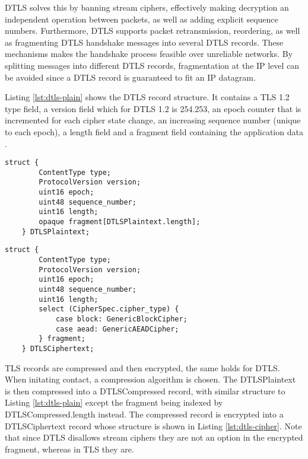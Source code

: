 \documentclass[0-thesis.tex]{subfiles}
\begin{document}
DTLS solves this by banning stream ciphers, effectively making decryption an independent
operation between packets, as well as adding explicit sequence numbers. Furthermore, DTLS
supports packet retransmission, reordering, as well as fragmenting DTLS handshake messages
into several DTLS records. These mechanisms makes the handshake process feasible over
unreliable networks. By splitting messages into different DTLS records, fragmentation at
the IP level can be avoided since a DTLS record is guaranteed to fit an IP datagram.

Listing \ref{lst:dtls-plain} shows the DTLS record structure. It contains a TLS 1.2 type
field, a version field which for DTLS 1.2 is 254.253, an epoch counter that is incremented
for each cipher state change, an increasing sequence number (unique to each epoch), a
length field and a fragment field containing the application data \parencite{rfc5246}.

\lstset{language=C}
\begin{lstlisting}[caption={The DTLS plaintext record structure.}, label={lst:dtls-plain}]
    struct {
        ContentType type;
        ProtocolVersion version;
        uint16 epoch;
        uint48 sequence_number;
        uint16 length;
        opaque fragment[DTLSPlaintext.length];
    } DTLSPlaintext;
\end{lstlisting}

\begin{lstlisting}[caption={The DTLS ciphertext record structure.}, label={lst:dtls-cipher}]
    struct {
        ContentType type;
        ProtocolVersion version;
        uint16 epoch;
        uint48 sequence_number;
        uint16 length;
        select (CipherSpec.cipher_type) {
            case block: GenericBlockCipher;
            case aead: GenericAEADCipher;
        } fragment;
    } DTLSCiphertext;
\end{lstlisting}

TLS records are compressed and then encrypted, the same holds for DTLS. When initating
contact, a compression algorithm is chosen. The DTLSPlaintext is then compressed into a
DTLSCompressed record, with similar structure to Listing \ref{lst:dtls-plain} except the
fragment being indexed by DTLSCompressed.length instead. The compressed record is
encrypted into a DTLSCiphertext record whose structure is shown in Listing
\ref{lst:dtls-cipher}. Note that since DTLS disallows stream ciphers they are not an
option in the encrypted fragment, whereas in TLS they are.
\end{document}
